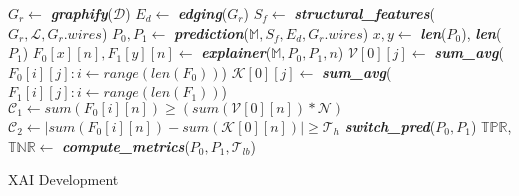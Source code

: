 \setlength{\textfloatsep}{0pt}
\begin{algorithm}[!t]
\DontPrintSemicolon %

$G_r \gets$ \textbf{\textit{graphify}}($\mathcal{D}$) \;
$E_d \gets$ \textbf{\textit{edging}}($G_r$) \;
$S_f \gets$ \textbf{\textit{structural\_features}}($G_r,\mathcal{L},G_r.wires$)\;
$P_0, P_1 \gets$ \textbf{\textit{prediction}}($\mathbb{M}, S_f, E_d, G_r.wires$)\;
$x, y \gets$ \textbf{\textit{len}}($P_0$),  \textbf{\textit{len}}($P_1$)\;
$F_0[x][n], F_1[y][n] \gets$ \textbf{\textit{explainer}}($\mathbb{M}, P_0, P_1, n$)\;
{
    $\mathcal{V}[0][j] \gets$ \textbf{\textit{sum\_avg}}($F_0[i][j]:i \gets range(len(F_0))$)\;
    $\mathcal{K}[0][j] \gets$ \textbf{\textit{sum\_avg}}($F_1[i][j]:i \gets range(len(F_1))$)\;
}
{
    $\mathcal{C}_{1} \gets sum(F_0[i][n]) \ge (sum(\mathcal{V}[0][n]) * \mathcal{N})$ \;
    $\mathcal{C}_{2} \gets |sum(F_0[i][n]) - sum(\mathcal{K}[0][n])| \ge \mathcal{T}_{h}$ \;
    {
        \textbf{\textit{switch\_pred}}($P_0, P_1$)\;
    }
}
$\mathbb{TPR}$, $\mathbb{TNR} \gets$ \textbf{\textit{compute\_metrics}}($P_0, P_1, \mathcal{T}_{lb}$) \;
\;
\caption{XAI Development}
\label{algo:XAI Development}
\end{algorithm}
